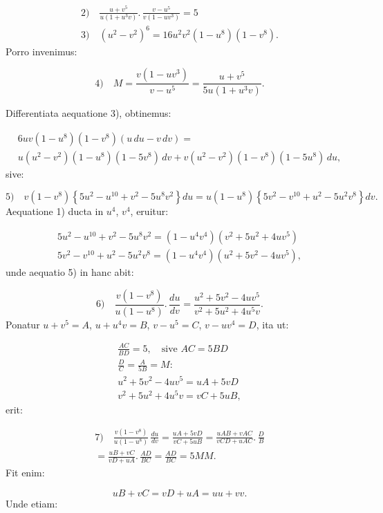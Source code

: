 \documentclass{article}
\begin{document}
\[
\begin{gathered}
\text{2)}\quad\frac{u+v^{5}}{u(1+u^{3}v)}.\,\frac{v-u^{5}}{v(1-uv^{3})}=5\\[1.5ex]
\text{3)}\quad(u^{2}-v^{2})^{6}=16u^{2}v^{2}(1-u^{8})(1-v^{8}).
\end{gathered}
\]
Porro invenimus:

\[
\text{4)}\quad M=\frac{v(1-uv^{3})}{v-u^{5}}=\frac{u+v^{5}}{5u(1+u^{3}v)}.
\]

Differentiata aequatione 3), obtinemus:

\[
\begin{gathered}
6uv(1-u^{8})(1-v^{8})(u\,du-v\,dv)=\\[1ex]
u(u^{2}-v^{2})(1-u^{8})(1-5v^{8})\,dv+v(u^{2}-v^{2})(1-v^{8})(1-5u^{8})\,du,
\end{gathered}
\]
sive:

\[
\text{5)}\quad v(1-v^{8})\left\{5u^{2}-u^{10}+v^{2}-5u^{8}v^{2}\right\}du=u(1-u^{8})\left\{5v^{2}-v^{10}+u^{2}-5u^{2}v^{8}\right\}dv.
\]
Aequatione 1) ducta in $u^{4}$, $v^{4}$, eruitur:

\[
\begin{gathered}
5u^{2}-u^{10}+v^{2}-5u^{8}v^{2}=(1-u^{4}v^{4})(v^{2}+5u^{2}+4uv^{5})\\[1ex]
5v^{2}-v^{10}+u^{2}-5u^{2}v^{8}=(1-u^{4}v^{4})(u^{2}+5v^{2}-4uv^{5}),
\end{gathered}
\]
unde aequatio 5) in hanc abit:

\[
\text{6)}\quad\frac{v(1-v^{8})}{u(1-u^{8})}.\,\frac{du}{dv}=\frac{u^{2}+5v^{2}-4uv^{5}}{v^{2}+5u^{2}+4u^{5}v}.
\]
Ponatur $u+v^{5}=A$, $u+u^{4}v=B$, $v-u^{5}=C$, $v-uv^{4}=D$, ita ut:

\[
\begin{gathered}
\frac{AC}{BD}=5,\quad\text{sive }AC=5BD\\[1.5ex]
\frac{D}{C}=\frac{A}{5B}=M:\\[1.5ex]
u^{2}+5v^{2}-4uv^{5}=uA+5vD\\[1ex]
v^{2}+5u^{2}+4u^{5}v=vC+5uB,
\end{gathered}
\]
erit:

\[
\begin{gathered}
\text{7)}\quad\frac{v(1-v^{8})}{u(1-u^{8})}\,\frac{du}{dv}=\frac{uA+5vD}{vC+5uB}=\frac{uAB+vAC}{vCD+uAC}.\,\frac{D}{B}\\[1.5ex]
=\frac{uB+vC}{vD+uA}.\,\frac{AD}{BC}=\frac{AD}{BC}=5MM.
\end{gathered}
\]
Fit enim:

\[
uB+vC=vD+uA=uu+vv.
\]
Unde etiam:
\end{document}
